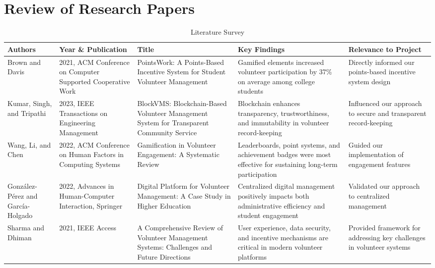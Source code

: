 \documentclass[12pt,a4paper]{report}
\begin{document}
\section{Review of Research Papers}

\begin{table}[h!]
    \centering
    \caption{Literature Survey}
    \label{tab:literature-survey}
    \small
    \begin{tabular}{|p{2cm}|p{2.5cm}|p{3cm}|p{3cm}|p{2.5cm}|}
        \hline
        \textbf{Authors} & \textbf{Year \& Publication} & \textbf{Title} & \textbf{Key Findings} & \textbf{Relevance to Project} \\
        \hline
        Brown and Davis & 2021, ACM Conference on Computer Supported Cooperative Work & PointsWork: A Points-Based Incentive System for Student Volunteer Management & Gamified elements increased volunteer participation by 37\% on average among college students & Directly informed our points-based incentive system design \\
        \hline
        Kumar, Singh, and Tripathi & 2023, IEEE Transactions on Engineering Management & BlockVMS: Blockchain-Based Volunteer Management System for Transparent Community Service & Blockchain enhances transparency, trustworthiness, and immutability in volunteer record-keeping & Influenced our approach to secure and transparent record-keeping \\
        \hline
        Wang, Li, and Chen & 2022, ACM Conference on Human Factors in Computing Systems & Gamification in Volunteer Engagement: A Systematic Review & Leaderboards, point systems, and achievement badges were most effective for sustaining long-term participation & Guided our implementation of engagement features \\
        \hline
        González-Pérez and García-Holgado & 2022, Advances in Human-Computer Interaction, Springer & Digital Platform for Volunteer Management: A Case Study in Higher Education & Centralized digital management positively impacts both administrative efficiency and student engagement & Validated our approach to centralized management \\
        \hline
        Sharma and Dhiman & 2021, IEEE Access & A Comprehensive Review of Volunteer Management Systems: Challenges and Future Directions & User experience, data security, and incentive mechanisms are critical in modern volunteer platforms & Provided framework for addressing key challenges in volunteer systems \\
        \hline
    \end{tabular}
\end{table}
\end{document}
